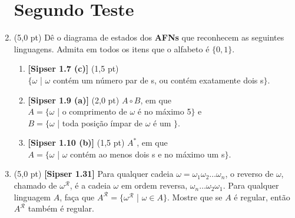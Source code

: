 \documentclass[12pt,a4paper,oneside]{article}
\begin{document}
\begin{enumerate}
	
	\section*{Segundo Teste}
	
	\item (5,0 pt) Dê o diagrama de estados dos {\bf AFNs} que reconhecem as seguintes linguagens. Admita em todos os itens que o alfabeto é  $\{0,1\}$.
		\begin{enumerate}
			\item {\bf [Sipser 1.7 (c)]} (1,5 pt) \\$\{\omega$ | $\omega$ contém um número par de {}s, ou contém exatamente dois {}s$\}$.
			\item {\bf [Sipser 1.9 (a)]} (2,0 pt) $A \circ B$, em que \\$A = \{\omega$ | o comprimento de $\omega$ é no máximo 5$\}$ e
			\\$B = \{\omega$ | toda posição ímpar de $\omega$ é um {}$\}$.
			\item {\bf [Sipser 1.10 (b)]} (1,5 pt) $A^*$, em que \\$A = \{\omega$ | $\omega$ contém ao menos dois {}s e no máximo um {}s$\}$.
		\end{enumerate}
	
	\item (5,0 pt) {\bf [Sipser 1.31]} Para qualquer cadeia $\omega = \omega_1 \omega_2 \ldots \omega_n$, o reverso de $\omega$, chamado de $\omega^{\mathcal{R}}$, é a cadeia $\omega$ em ordem reversa, $\omega_n \ldots \omega_2 \omega_1$. Para qualquer linguagem $A$, faça que $A^{\mathcal{R}} = \{ \omega^{\mathcal{R}}$ | $\omega \in A\}$. Mostre que se $A$ é regular, então $A^{\mathcal{R}}$ também é regular.

\end{enumerate}
\end{document}
